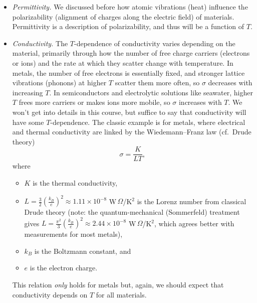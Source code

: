 \documentclass[11pt, oneside]{article}
\begin{document}
\begin{itemize}
	\item \emph{Permittivity.} We discussed before how atomic vibrations (heat) influence the polarizability (alignment of charges along the electric field) of materials. Permittivity is a description of polarizability, and thus will be a function of $T$.
	\item \emph{Conductivity.} The $T$-dependence of conductivity varies depending on the material, primarily through how the number of free charge carriers (electrons or ions) and the rate at which they scatter change with temperature. In metals, the number of free electrons is essentially fixed, and stronger lattice vibrations (phonons) at higher $T$ scatter them more often, so $\sigma$ decreases with increasing $T$. In semiconductors and electrolytic solutions like seawater, higher $T$ frees more carriers or makes ions more mobile, so $\sigma$ increases with $T$. We won't get into details in this course, but suffice to say that conductivity will have some $T$-dependence. The classic example is for metals, where electrical and thermal conductivity are linked by the Wiedemann--Franz law (cf.\ Drude theory)
	\begin{equation}
		\sigma = \frac{K}{LT},
	\end{equation}
	where
	\begin{itemize}
		\item $K$ is the thermal conductivity,
		\item $L = \frac{3}{2}\left(\frac{k_B}{e}\right)^2 \approx 1.11\times10^{-8}$ W$\,\Omega$/K$^2$ is the Lorenz number from classical Drude theory (note: the quantum-mechanical (Sommerfeld) treatment gives $L = \frac{\pi^2}{3}\left(\frac{k_B}{e}\right)^2 \approx 2.44\times10^{-8}$ W$\,\Omega$/K$^2$, which agrees better with measurements for most metals),
		\item $k_B$ is the Boltzmann constant, and
		\item $e$ is the electron charge.
	\end{itemize}
	This relation \emph{only} holds for metals but, again, we should expect that conductivity depends on $T$ for all materials.
\end{itemize}
\end{document}
